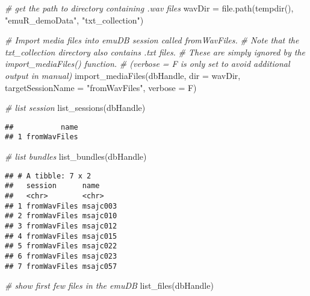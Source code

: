 \documentclass[
]{book}
\newenvironment{Shaded}{\begin{snugshade}}{\end{snugshade}}
\newcommand{\AttributeTok}[1]{\textcolor[rgb]{0.77,0.63,0.00}{#1}}
\newcommand{\CommentTok}[1]{\textcolor[rgb]{0.56,0.35,0.01}{\textit{#1}}}
\newcommand{\FunctionTok}[1]{\textcolor[rgb]{0.00,0.00,0.00}{#1}}
\newcommand{\NormalTok}[1]{#1}
\newcommand{\OtherTok}[1]{\textcolor[rgb]{0.56,0.35,0.01}{#1}}
\newcommand{\StringTok}[1]{\textcolor[rgb]{0.31,0.60,0.02}{#1}}
\begin{document}
\begin{Shaded}
\begin{Highlighting}[]
\CommentTok{\# get the path to directory containing .wav files}
\NormalTok{wavDir }\OtherTok{=} \FunctionTok{file.path}\NormalTok{(}\FunctionTok{tempdir}\NormalTok{(), }\StringTok{"emuR\_demoData"}\NormalTok{, }\StringTok{"txt\_collection"}\NormalTok{)}

\CommentTok{\# Import media files into emuDB session called fromWavFiles.}
\CommentTok{\# Note that the txt\_collection directory also contains .txt files.}
\CommentTok{\# These are simply ignored by the import\_mediaFiles() function.}
\CommentTok{\# (verbose = F is only set to avoid additional output in manual)}
\FunctionTok{import\_mediaFiles}\NormalTok{(dbHandle,}
                  \AttributeTok{dir =}\NormalTok{ wavDir,}
                  \AttributeTok{targetSessionName =} \StringTok{"fromWavFiles"}\NormalTok{,}
                  \AttributeTok{verbose =}\NormalTok{ F)}

\CommentTok{\# list session}
\FunctionTok{list\_sessions}\NormalTok{(dbHandle)}
\end{Highlighting}
\end{Shaded}

\begin{verbatim}
##           name
## 1 fromWavFiles
\end{verbatim}

\begin{Shaded}
\begin{Highlighting}[]
\CommentTok{\# list bundles}
\FunctionTok{list\_bundles}\NormalTok{(dbHandle)}
\end{Highlighting}
\end{Shaded}

\begin{verbatim}
## # A tibble: 7 x 2
##   session      name    
##   <chr>        <chr>   
## 1 fromWavFiles msajc003
## 2 fromWavFiles msajc010
## 3 fromWavFiles msajc012
## 4 fromWavFiles msajc015
## 5 fromWavFiles msajc022
## 6 fromWavFiles msajc023
## 7 fromWavFiles msajc057
\end{verbatim}

\begin{Shaded}
\begin{Highlighting}[]
\CommentTok{\# show first few files in the emuDB}
\FunctionTok{list\_files}\NormalTok{(dbHandle)}
\end{Highlighting}
\end{Shaded}
\end{document}
